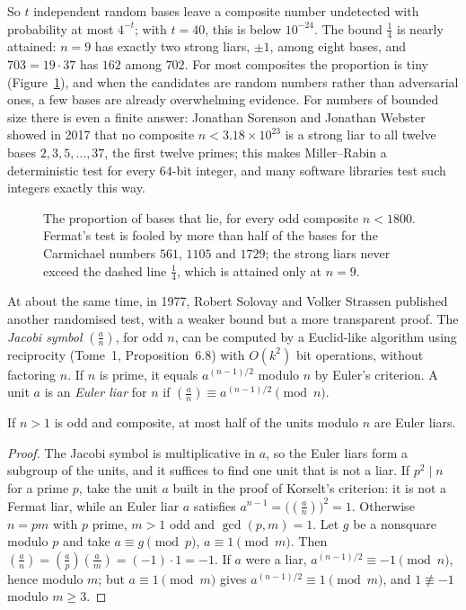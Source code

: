 So $t$ independent random bases leave a composite number undetected with probability at most $4^{-t}$; with $t=40$, this is below $10^{-24}$. The bound $\frac14$ is nearly attained: $n=9$ has exactly two strong liars, $\pm1$, among eight bases, and $703=19\cdot37$ has $162$ among $702$. For most composites the proportion is tiny (Figure~\ref{fig:liars}), and when the candidates are random numbers rather than adversarial ones, a few bases are already overwhelming evidence.
For numbers of bounded size there is even a finite answer: Jonathan Sorenson and Jonathan Webster showed in 2017 that no composite $n<3.18\times10^{23}$ is a strong liar to all twelve bases $2,3,5,\dots,37$, the first twelve primes; this makes Miller--Rabin a deterministic test for every $64$-bit integer, and many software libraries test such integers exactly this way.

\begin{figure}[ht]
\centering
{}
\caption{The proportion of bases that lie, for every odd composite $n<1800$. Fermat's test is fooled by more than half of the bases for the Carmichael numbers $561$, $1105$ and $1729$; the strong liars never exceed the dashed line $\frac14$, which is attained only at $n=9$.}
\label{fig:liars}
\end{figure}

At about the same time, in 1977, Robert Solovay and Volker Strassen published another randomised test, with a weaker bound but a more transparent proof. The \emph{Jacobi symbol} $\left(\frac an\right)$, for odd $n$, can be computed by a Euclid-like algorithm using reciprocity (Tome~1, Proposition~6.8) with $O(k^2)$ bit operations, without factoring $n$.
If $n$ is prime, it equals $a^{(n-1)/2}$ modulo $n$ by Euler's criterion. A unit $a$ is an \emph{Euler liar} for $n$ if $\left(\frac an\right)\equiv a^{(n-1)/2}\pmod n$.

\begin{theorem}\label{thm:solovay}
If $n>1$ is odd and composite, at most half of the units modulo $n$ are Euler liars.
\end{theorem}
\begin{proof}
The Jacobi symbol is multiplicative in $a$, so the Euler liars form a subgroup of the units, and it suffices to find one unit that is not a liar. If $p^2\mid n$ for a prime $p$, take the unit $a$ built in the proof of Korselt's criterion: it is not a Fermat liar, while an Euler liar $a$ satisfies $a^{n-1}=\bigl(\left(\frac an\right)\bigr)^2=1$. Otherwise $n=pm$ with $p$ prime, $m>1$ odd and $\gcd(p,m)=1$.
Let $g$ be a nonsquare modulo $p$ and take $a\equiv g\pmod p$, $a\equiv1\pmod m$. Then $\left(\frac an\right)=\left(\frac ap\right)\left(\frac am\right)=(-1)\cdot1=-1$. If $a$ were a liar, $a^{(n-1)/2}\equiv-1\pmod n$, hence modulo $m$; but $a\equiv1\pmod m$ gives $a^{(n-1)/2}\equiv1\pmod m$, and $1\not\equiv-1$ modulo $m\ge3$.
\end{proof}

